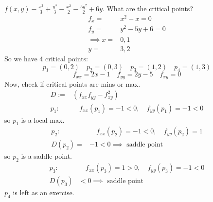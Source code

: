 \documentclass[12pt]{book}
\theoremstyle{definition}
\theoremstyle{remark}
\begin{document}
  \begin{example}
    $f(x,y) - \frac{x^3}{3}  + \frac{y^3}{3} - \frac{x^2}{2} - \frac{5y^2}{2} + 6y$. What are the critical points? 
    \begin{equation*}
      \begin{split}
        f_x =& x^2 - x = 0 \\ 
        f_y =& y^2 -5y +6 = 0 \\ 
        \implies x =& 0,1 \\ 
            y =& 3,2 
      \end{split}
    \end{equation*}
    So we have 4 critical points: 
    $$p_1 = (0,2) \quad p_2 = (0,3) \quad p_3 = (1,2) \quad p_4 = (1,3) $$ 
    $$f_{xx} = 2x -1 \quad f_{yy} = 2y-5  \quad f_{xy} = 0 $$
    Now, check if critical points are mins or max. 
    \begin{equation*}
      \begin{split}
        D :=& (f_{xx} f_{yy} - f_{xy}^2) \\ 
        p_1 :& \quad f_{xx}(p_1) = -1 < 0, \quad f_{yy}(p_1) = -1 < 0
      \end{split}
    \end{equation*}
    so $p_1$ is a local max. 
    \begin{equation*}
      \begin{split}
        p_2:& \quad f_{xx}(p_2) = -1 < 0 ,\quad f_{yy} (p_2) = 1 \\ 
        D(p_2)=& -1 < 0 \implies \text{ saddle point }
      \end{split}
    \end{equation*}
    so $p_2$ is a saddle point. 
    \begin{equation*}
      \begin{split}
        p_3:& \quad f_{xx} (p_3) = 1 >0, \quad f_{yy} (p_3) = -1 < 0 \\ 
        D(p_3)& < 0 \implies \text{ saddle point }
      \end{split}
    \end{equation*}
    $p_4$ is left as an exercise. 
  \end{example}
\end{document}
